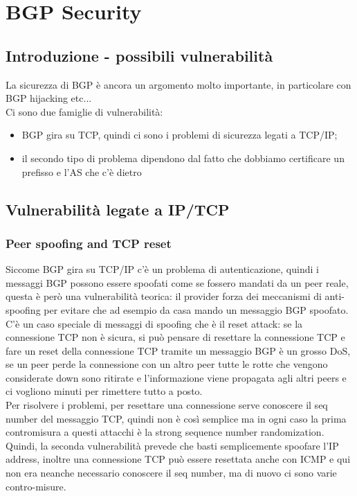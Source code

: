 \documentclass[12pt, oneside]{extbook} %
\begin{document}
\chapter*{BGP Security}

\section{Introduzione - possibili vulnerabilità}
La sicurezza di BGP è ancora un argomento molto importante, in particolare con BGP hijacking etc...
\\Ci sono due famiglie di vulnerabilità:
\begin{itemize}
    \item BGP gira su TCP, quindi ci sono i problemi di sicurezza legati a TCP/IP;
    \item il secondo tipo di problema dipendono dal fatto che dobbiamo certificare un prefisso e l'AS che c'è dietro
\end{itemize}

\section{Vulnerabilità legate a IP/TCP}

\subsection{Peer spoofing and TCP reset}
Siccome BGP gira su TCP/IP c'è un problema di autenticazione, quindi i messaggi BGP possono essere spoofati come se fossero mandati da un peer reale, questa è però una vulnerabilità teorica: il provider forza dei meccanismi di anti-spoofing per evitare che ad esempio da casa mando un messaggio BGP spoofato.
\\C'è un caso speciale di messaggi di spoofing che è il reset attack: se la connessione TCP non è sicura, si può pensare di resettare la connessione TCP e fare un reset della connessione TCP tramite un messaggio BGP è un grosso DoS, se un peer perde la connessione con un altro peer tutte le rotte che vengono considerate down sono ritirate e l'informazione viene propagata agli altri peers e ci vogliono minuti per rimettere tutto a posto.
\\Per risolvere i problemi, per resettare una connessione serve conoscere il seq number del messaggio TCP, quindi non è così semplice ma in ogni caso la prima contromisura a questi attacchi è la strong sequence number randomization.
\\Quindi, la seconda vulnerabilità prevede che basti semplicemente spoofare l'IP address, inoltre una connessione TCP può essere resettata anche con ICMP e qui non era neanche necessario conoscere il seq number, ma di nuovo ci sono varie contro-misure.
\end{document}
